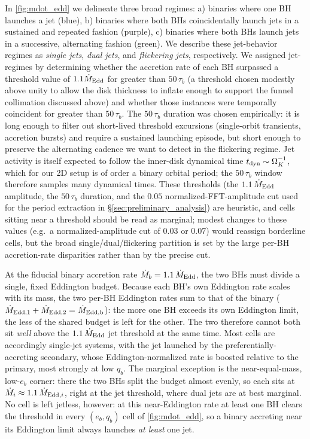 \documentclass[fleqn,usenatbib]{mnras}
\begin{document}
In \autoref{fig:mdot_edd} we delineate three broad regimes: a) binaries where one BH launches a jet (blue), b) binaries where both BHs coincidentally launch jets in a sustained and repeated fashion (purple), c) binaries where both BHs launch jets in a successive, alternating fashion (green). We describe these jet-behavior regimes as \emph{single jets}, \emph{dual jets}, and \emph{flickering jets}, respectively. We assigned jet-regimes by determining whether the accretion rate of each BH surpassed a threshold value of $1.1 \dot{M}_{\rm Edd}$ for greater than $50\,\tau_b$ (a threshold chosen modestly above unity to allow the disk thickness to inflate enough to support the funnel collimation discussed above) and whether those instances were temporally coincident for greater than $50\,\tau_b$. The $50\,\tau_b$ duration was chosen empirically: it is long enough to filter out short-lived threshold excursions (single-orbit transients, accretion bursts) and require a sustained launching episode, but short enough to preserve the alternating cadence we want to detect in the flickering regime. Jet activity is itself expected to follow the inner-disk dynamical time $t_{\rm dyn} \sim \Omega_K^{-1}$, which for our 2D setup is of order a binary orbital period; the $50\,\tau_b$ window therefore samples many dynamical times. These thresholds (the $1.1\,\dot{M}_{\rm Edd}$ amplitude, the $50\,\tau_b$ duration, and the $0.05$ normalized-FFT-amplitude cut used for the period extraction in \S\ref{sec:preliminary_analysis}) are heuristic, and cells sitting near a threshold should be read as marginal; modest changes to these values (e.g.\ a normalized-amplitude cut of $0.03$ or $0.07$) would reassign borderline cells, but the broad single/dual/flickering partition is set by the large per-BH accretion-rate disparities rather than by the precise cut.

At the fiducial binary accretion rate $\dot{M}_b = 1.1\,\dot{M}_{\rm Edd}$, the two BHs must divide a single, fixed Eddington budget. Because each BH's own Eddington rate scales with its mass, the two per-BH Eddington rates sum to that of the binary ($\dot{M}_{\rm Edd,1} + \dot{M}_{\rm Edd,2} = \dot{M}_{\rm Edd,b}$): the more one BH exceeds its own Eddington limit, the less of the shared budget is left for the other. The two therefore cannot both sit \textit{well} above the $1.1\,\dot{M}_{\rm Edd}$ jet threshold at the same time. Most cells are accordingly single-jet systems, with the jet launched by the preferentially-accreting secondary, whose Eddington-normalized rate is boosted relative to the primary, most strongly at low $q_b$. The marginal exception is the near-equal-mass, low-$e_b$ corner: there the two BHs split the budget almost evenly, so each sits at $\dot{M}_i \approx 1.1\,\dot{M}_{{\rm Edd},i}$, right at the jet threshold, where dual jets are at best marginal. No cell is left jetless, however: at this near-Eddington rate at least one BH clears the threshold in every $(e_b, q_b)$ cell of \autoref{fig:mdot_edd}, so a binary accreting near its Eddington limit always launches \textit{at least} one jet.
\end{document}
